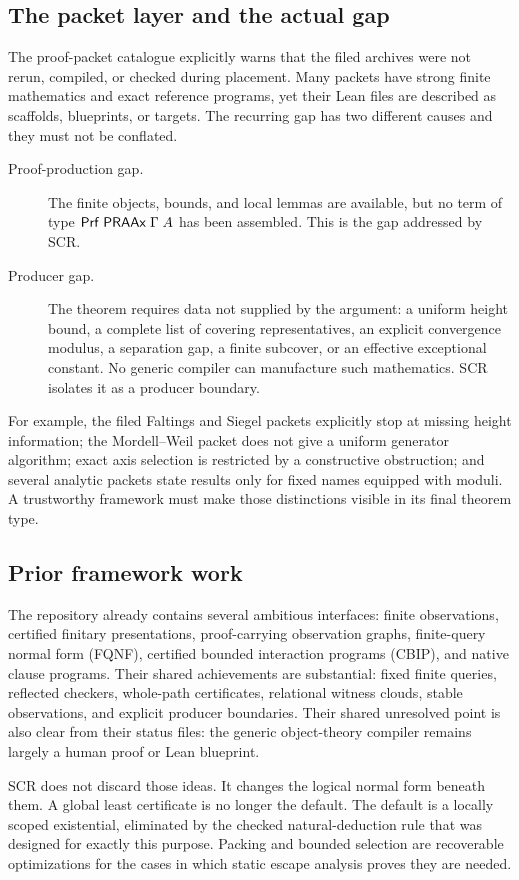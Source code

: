 \subsection{The packet layer and the actual gap}

The proof-packet catalogue explicitly warns that the filed archives were not
rerun, compiled, or checked during placement.  Many packets have strong finite
mathematics and exact reference programs, yet their Lean files are described
as scaffolds, blueprints, or targets.  The recurring gap has two different
causes and they must not be conflated.

\begin{description}
\item[Proof-production gap.]  The finite objects, bounds, and local lemmas are
available, but no term of type \(\mathsf{Prf}\;\mathsf{PRAAx}\;\Gamma\;A\) has been assembled.
This is the gap addressed by SCR.
\item[Producer gap.]  The theorem requires data not supplied by the argument:
a uniform height bound, a complete list of covering representatives, an
explicit convergence modulus, a separation gap, a finite subcover, or an
effective exceptional constant.  No generic compiler can manufacture such
mathematics.  SCR isolates it as a producer boundary.
\end{description}

For example, the filed Faltings and Siegel packets explicitly stop at missing
height information; the Mordell--Weil packet does not give a uniform generator
algorithm; exact axis selection is restricted by a constructive obstruction;
and several analytic packets state results only for fixed names equipped with
moduli.  A trustworthy framework must make those distinctions visible in its
final theorem type.

\subsection{Prior framework work}

The repository already contains several ambitious interfaces: finite
observations, certified finitary presentations, proof-carrying observation
graphs, finite-query normal form (FQNF), certified bounded interaction programs
(CBIP), and native clause programs.  Their shared achievements are substantial:
fixed finite queries, reflected checkers, whole-path certificates, relational
witness clouds, stable observations, and explicit producer boundaries.  Their
shared unresolved point is also clear from their status files: the generic
object-theory compiler remains largely a human proof or Lean blueprint.

SCR does not discard those ideas.  It changes the logical normal form beneath
them.  A global least certificate is no longer the default.  The default is a
locally scoped existential, eliminated by the checked natural-deduction rule
that was designed for exactly this purpose.  Packing and bounded selection are
recoverable optimizations for the cases in which static escape analysis proves
they are needed.
